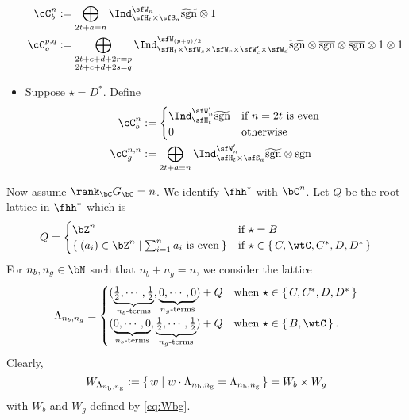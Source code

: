\documentclass[12pt,a4paper]{amsart}
\newcommand{\Res}{\mathrm{Res}}
\newcommand{\sgn}{\operatorname{sgn}}
\numberwithin{equation}{section}
\theoremstyle{remark}
\def\half{{\tfrac{1}{2}}}
\def\Cint#1{\Coh_{[#1]}}
\def\Gc{G_\bC}
\def\bsgn{\overline{\sgn}}
\def\nbb{n_{\mathrm b}}
\def\ngg{n_{\mathrm g}}
\def\Coh{\mathrm{Coh}}
\def\hsgn{\widetilde{\mathrm{sgn}}}
\begin{document}
\begin{itemize}
\[        \begin{split}
          \cC_b^{n} & := \bigoplus_{\substack{2t+a=n}}
          \Ind_{\sfH_{t}\times \sfS_{a}}^{\sfW_{n}} \hsgn\otimes 1\\
          \cC_g^{p,q} %
          & := \bigoplus_{\substack{2t+c+d+2r=p\\2t+c+d+2s=q}}
          \Ind_{\sfH_{t} \times \sfW_s\times \sfW_r\times \sfW'_{c}\times \sfW_{d} }^{\sfW_{(p+q)/2}} \hsgn \otimes \bsgn \otimes \bsgn \otimes 1\otimes
          1 %
          \\
        \end{split}
        \]
  \item Suppose $\star=D^{*}$. Define
        \[
        \begin{split}
          \cC_b^{n} & :=
          \begin{cases}
            \Ind_{\sfH_{t}}^{\sfW'_{n}} \hsgn &
            \text{if $n=2t$ is even} \\
            0 & \text{otherwise}\\
          \end{cases}\\
          \cC_g^{n,n} %
          &:=\bigoplus_{\substack{2t+a=n}} \Ind_{\sfH_{t} \times \sfS_{a}}^{\sfW'_{n}}
          \hsgn \otimes \sgn \\
        \end{split}
        \]
\end{itemize}

Now assume $\rank_{\bC} \Gc = n$. We identify $\fhh^{*}$ with $\bC^{n}$. Let $Q$
be the root lattice in $\fhh^{*}$ which is
\[
  Q = \begin{cases}
    \bZ^{n} & \text{if  $\star = B$}\\
    \Set{(a_{i})\in \bZ^{n}|\sum_{i=1}^{n}a_{i} \text{ is even}}
    & \text{if  $\star \in \set{C,\wtC,C^{*},D,D^{*}}$}\\
  \end{cases}
\]
For $n_{b}, n_{g}\in \bN$ such that $n_{b}+n_{g}=n$, we consider the lattice
\[
  \Lambda_{n_{b},n_{g}} =
  \begin{cases}
    (\underbrace{\half, \cdots, \half}_{n_{b}\text{-terms}}, \underbrace{0, \cdots, 0}_{n_{g}\text{-terms}}) + Q & \text{when
    } \star\in \set{C,C^{*}, D,D^{*}}\\%
    (\underbrace{0, \cdots, 0}_{n_{b}\text{-terms}}, \underbrace{\half, \cdots, \half}_{n_{g}\text{-terms}}) + Q & \text{when
    } \star\in \set{B,\wtC}. %
  \end{cases}
\]
Clearly,
\[
  W_{\Lambda_{\nbb,\ngg}}:= \set{w| w\cdot \Lambda_{\nbb,\ngg} = \Lambda_{\nbb,\ngg}} = W_{b}\times W_{g}
\]
with $W_{b}$ and $W_{g}$ defined by \eqref{eq:Wbg}.
\end{document}
